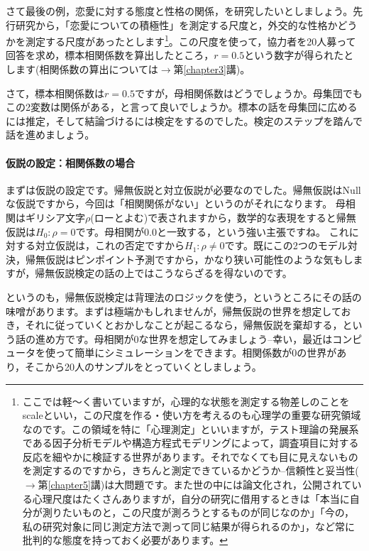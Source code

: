 \documentclass{ltjsarticle}
\begin{document}
さて最後の例，恋愛に対する態度と性格の関係，を研究したいとしましょう。先行研究から，「恋愛についての積極性」を測定する尺度と，外交的な性格かどうかを測定する尺度があったとします\footnote{ここでは軽〜く書いていますが，心理的な状態を測定する物差しのことをscaleといい，この尺度を作る・使い方を考えるのも心理学の重要な研究領域なのです。この領域を特に「心理測定」といいますが，テスト理論の発展系である因子分析モデルや構造方程式モデリングによって，調査項目に対する反応を細やかに検証する世界があります。それでなくても目に見えないものを測定するのですから，きちんと測定できているかどうか--信頼性と妥当性($\to$第\ref{chapter5}講)は大問題です。また世の中には論文化され，公開されている心理尺度はたくさんありますが，自分の研究に借用するときは「本当に自分が測りたいものと，この尺度が測ろうとするものが同じなのか」「今の，私の研究対象に同じ測定方法で測って同じ結果が得られるのか」，など常に批判的な態度を持っておく必要があります。}。この尺度を使って，協力者を20人募って回答を求め，標本相関係数を算出したところ，$r=0.5$という数字が得られたとします(相関係数の算出については$\to$第\ref{chapter3}講)。

さて，標本相関係数は$r=0.5$ですが，母相関係数はどうでしょうか。母集団でもこの2変数は関係がある，と言って良いでしょうか。標本の話を母集団に広めるには推定，そして結論づけるには検定をするのでした。検定のステップを踏んで話を進めましょう。

\paragraph{仮説の設定：相関係数の場合}
まずは仮説の設定です。帰無仮説と対立仮説が必要なのでした。帰無仮説はNullな仮説ですから，今回は「相関関係がない」というのがそれになります。
母相関はギリシア文字$\rho$(ローとよむ)で表されますから，数学的な表現をすると帰無仮説は$H_0: \rho =0$です。母相関が$0.0$と一致する，という強い主張ですね。
これに対する対立仮説は，これの否定ですから$H_1:\rho \neq 0$です。既にこの2つのモデル対決，帰無仮説はピンポイント予測ですから，かなり狭い可能性のような気もしますが，帰無仮説検定の話の上ではこうならざるを得ないのです。

というのも，帰無仮説検定は背理法のロジックを使う，というところにその話の味噌があります。まずは極端かもしれませんが，帰無仮説の世界を想定しておき，それに従っていくとおかしなことが起こるなら，帰無仮説を棄却する，という話の進め方です。母相関が0な世界を想定してみましょう--幸い，最近はコンピュータを使って簡単にシミュレーションをできます。相関係数が0の世界があり，そこから20人のサンプルをとっていくとしましょう。
\end{document}
